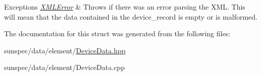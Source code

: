 \begin{DoxyExceptions}{Exceptions}
{\em \hyperlink{classsunspec_1_1data_1_1_x_m_l_error}{X\+M\+L\+Error}} & Throws if there was an error parsing the X\+ML. This will mean that the data contained in the {\ttfamily device\+\_\+record} is empty or is malformed. \\
\hline
\end{DoxyExceptions}


The documentation for this struct was generated from the following files\+:\begin{DoxyCompactItemize}
\item 
sunspec/data/element/\hyperlink{_device_data_8hpp}{Device\+Data.\+hpp}\item 
sunspec/data/element/Device\+Data.\+cpp\end{DoxyCompactItemize}

